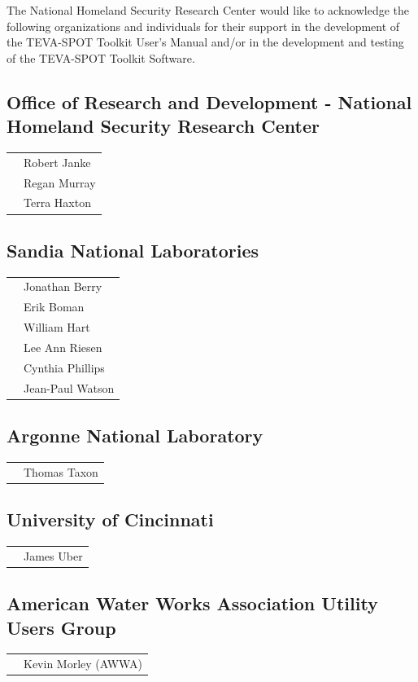 The National Homeland Security Research Center would like to acknowledge 
the following organizations and individuals for their support in the
development of the TEVA-SPOT Toolkit User's Manual and/or in the development and
testing of the TEVA-SPOT Toolkit Software.

\subsection*{Office of Research and Development - National Homeland Security
  Research Center}
\begin{tabular}{ll}
& Robert Janke \\
& Regan Murray \\
& Terra Haxton \\
\end{tabular}


\subsection*{Sandia National Laboratories}
\begin{tabular}{ll}
& Jonathan Berry \\
& Erik Boman \\
& William Hart \\
& Lee Ann Riesen \\
& Cynthia Phillips \\
& Jean-Paul Watson\\
\end{tabular}

\subsection*{Argonne National Laboratory}
\begin{tabular}{ll}
& Thomas Taxon\\
\end{tabular}

\subsection*{University of Cincinnati}
\begin{tabular}{ll}
& James Uber\\
\end{tabular}

\subsection*{American Water Works Association Utility Users Group}
\begin{tabular}{ll}
& Kevin Morley (AWWA) \\
\end{tabular}

